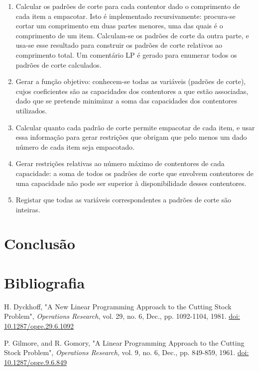 \documentclass[12pt, a4paper, titlepage]{article}
\begin{document}
\begin{enumerate}
    \item Calcular os padrões de corte para cada contentor dado o comprimento de cada item a
        empacotar. Isto é implementado recursivamente: procura-se cortar um comprimento em duas
        partes menores, uma das quais é o comprimento de um item. Calculam-se os padrões de corte da
        outra parte, e usa-se esse resultado para construir os padrões de corte relativos ao
        comprimento total. Um comentário LP é gerado para enumerar todos os padrões de corte
        calculados.

    \item Gerar a função objetivo: conhecem-se todas as variáveis (padrões de corte), cujos
        coeficientes são as capacidades dos contentores a que estão associadas, dado que se pretende
        minimizar a soma das capacidades dos contentores utilizados.

    \item Calcular quanto cada padrão de corte permite empacotar de cada item, e usar essa
        informação para gerar restrições que obrigam que pelo menos um dado número de cada item seja
        empacotado.

    \item Gerar restrições relativas ao número máximo de contentores de cada capacidade: a soma de
        todos os padrões de corte que envolvem contentores de uma capacidade não pode ser superior à
        disponibilidade desses contentores.

    \item Registar que todas as variáveis correspondentes a padrões de corte são inteiras.
\end{enumerate}

\section{Conclusão}


\section{Bibliografia}
\def\refname{}
\vspace{-1.5cm}
\begin{thebibliography}{9}
    H. Dyckhoff, "A New Linear Programming Approach to the Cutting Stock Problem",
    \emph{Operations Research}, vol. 29, no. 6, Dec., pp. 1092-1104, 1981.
    \href{https://doi.org/10.1287/opre.29.6.1092}{doi: 10.1287/opre.29.6.1092}

    P. Gilmore, and R. Gomory, "A Linear Programming Approach to the Cutting Stock Problem",
    \emph{Operations Research}, vol. 9, no. 6, Dec., pp. 849-859, 1961.
    \href{https://doi.org/10.1287/opre.9.6.849}{doi: 10.1287/opre.9.6.849}
\end{thebibliography}
\end{document}
